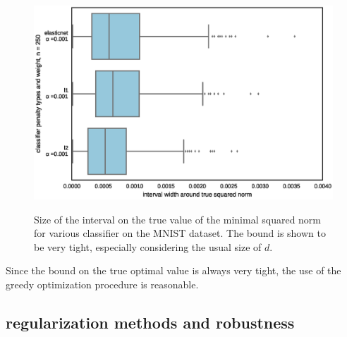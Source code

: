 \documentclass{article} %
\begin{document}
\begin{figure}[h!]
\begin{center}
\includegraphics[scale=0.65]{figs/experiment_1}
\label{res:exp1}
\caption{\small Size of the interval on the true value of the minimal squared norm for various
                classifier on the MNIST dataset. The bound is shown to be very tight, especially considering the usual size of $d$.}
\end{center}
\end{figure}

Since the bound on the true optimal value is always very tight, the use of
the greedy optimization procedure is reasonable.


\newpage
\subsection{regularization methods and robustness}
\end{document}
